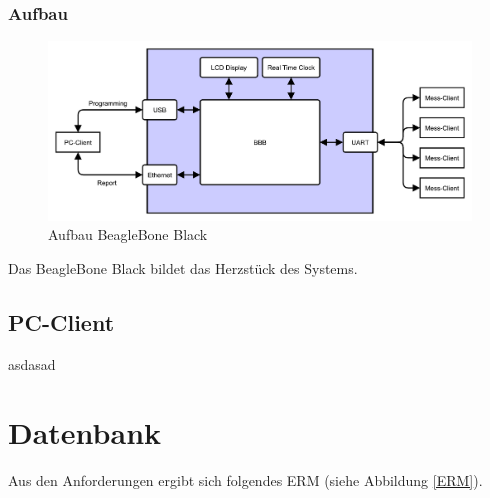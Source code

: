 \subsubsection{Aufbau}


\begin{figure}[H]
\begin{center}
\includegraphics[width=\textwidth]{img/general/UebersichtMaster.pdf}
\caption{Aufbau BeagleBone Black}
\label{figure_AufbauBleagleBone}
\end{center}
\end{figure}

Das BeagleBone Black bildet das Herzstück des Systems.



\newpage
\subsection{PC-Client}
\label{section_Verwaltung}
asdasad

\newpage



\newpage
\section{Datenbank}
\label{section_EntwurfDatenbank}

Aus den Anforderungen ergibt sich folgendes \ac{ERM} (siehe Abbildung \ref{ERM}). \\

